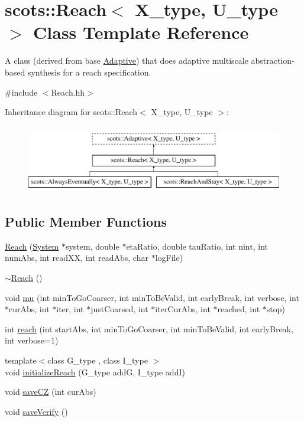\hypertarget{classscots_1_1Reach}{}\section{scots\+:\+:Reach$<$ X\+\_\+type, U\+\_\+type $>$ Class Template Reference}
\label{classscots_1_1Reach}


A class (derived from base \hyperlink{classscots_1_1Adaptive}{Adaptive}) that does adaptive multiscale abstraction-\/based synthesis for a reach specification.  




{\ttfamily \#include $<$Reach.\+hh$>$}

Inheritance diagram for scots\+:\+:Reach$<$ X\+\_\+type, U\+\_\+type $>$\+:\begin{figure}[H]
\begin{center}
\leavevmode
\includegraphics[height=3.000000cm]{classscots_1_1Reach}
\end{center}
\end{figure}
\subsection*{Public Member Functions}
\begin{DoxyCompactItemize}
\item 
\hyperlink{classscots_1_1Reach_a8da1e1c12f4d050f7006fafddb2c3307}{Reach} (\hyperlink{classscots_1_1System}{System} $\ast$system, double $\ast$eta\+Ratio, double tau\+Ratio, int nint, int num\+Abs, int read\+XX, int read\+Abs, char $\ast$log\+File)
\item 
\hyperlink{classscots_1_1Reach_a05425187c9015158f5495904c34342d0}{$\sim$\+Reach} ()
\item 
void \hyperlink{classscots_1_1Reach_a6787ba675345efb35d5b5dcd720cf389}{mu} (int min\+To\+Go\+Coarser, int min\+To\+Be\+Valid, int early\+Break, int verbose, int $\ast$cur\+Abs, int $\ast$iter, int $\ast$just\+Coarsed, int $\ast$iter\+Cur\+Abs, int $\ast$reached, int $\ast$stop)
\item 
int \hyperlink{classscots_1_1Reach_aae2c35919866a8235f822542a4bb3dfe}{reach} (int start\+Abs, int min\+To\+Go\+Coarser, int min\+To\+Be\+Valid, int early\+Break, int verbose=1)
\item 
{\footnotesize template$<$class G\+\_\+type , class I\+\_\+type $>$ }\\void \hyperlink{classscots_1_1Reach_ad49c77293343ad0ce4f36c9deee45f00}{initialize\+Reach} (G\+\_\+type addG, I\+\_\+type addI)
\item 
void \hyperlink{classscots_1_1Reach_ada9bf5083703b737976effb85de28c4b}{save\+CZ} (int cur\+Abs)
\item 
void \hyperlink{classscots_1_1Reach_ab9c39fa2834a0a8f08abe48838ae1c41}{save\+Verify} ()
\end{DoxyCompactItemize}
